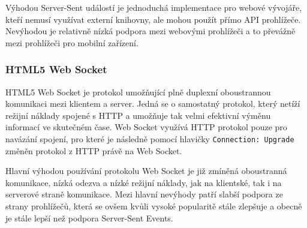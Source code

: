 Výhodou Server-Sent událostí je jednoduchá implementace pro webové vývojáře, kteří nemusí využívat externí knihovny, ale mohou použít přímo \gls{API} prohlížeče.
Nevýhodou je relativně nízká podpora mezi webovými prohlížeči a to převážně mezi prohlížeči pro mobilní zařízení.~\cite{pushpull:issuesRFC}

\subsubsection{HTML5 Web Socket}\label{subsubsec:websocket}

HTML5 Web Socket je protokol umožňující plně duplexní oboustrannou komunikaci mezi klientem a server.
Jedná se o samostatný protokol, který netíží režijní náklady spojené s \gls{HTTP} a umožňuje tak velmi efektivní výměnu informací ve skutečném čase.
Web Socket využívá \gls{HTTP} protokol pouze pro navázání spojení, pro které je následně pomocí hlavičky \texttt{Connection: Upgrade} změněn protokol z \gls{HTTP} právě na Web Socket.~\cite{pushpull:websocketQuantum}

Hlavní výhodou používání protokolu Web Socket je již zmíněná oboustranná komunikace, nízká odezva a nízké režijní náklady, jak na klientské, tak i na serverové straně komunikace.
Mezi hlavní nevýhody patří slabší podpora ze strany prohlížečů, která se ovšem kvůli vysoké popularitě stále zlepšuje a obecně je stále lepší než podpora Server-Sent Events.~\cite{pushpull:compare}
